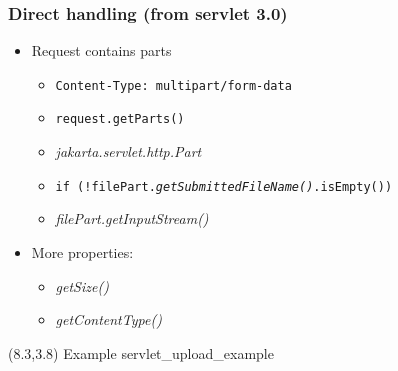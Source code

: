 \documentclass[10pt,xcolor=pdflatex]{beamer}
\begin{document}
\begin{frame}[containsverbatim]\frametitle{Direct handling (from servlet 3.0)}
\begin{itemize}
	\item Request contains parts 
          \begin{itemize}
              \item  \texttt{Content-Type: multipart/form-data}
              \item \texttt{request.getParts()}
              \item \emph{jakarta.servlet.http.Part}
              \item \texttt{if (!filePart.\emph{getSubmittedFileName()}.isEmpty())}
              \item \emph{filePart.getInputStream()}
          \end{itemize}

	\item More properties:
	\begin{itemize}
        \item \emph{getSize()}
        \item \emph{	getContentType()}
    \end{itemize}
\end{itemize}
  \begin{textblock}{6}(8.3,3.8)
    {\footnotesize Example servlet\_upload\_example}
  \end{textblock}
\end{frame}

\end{document}
